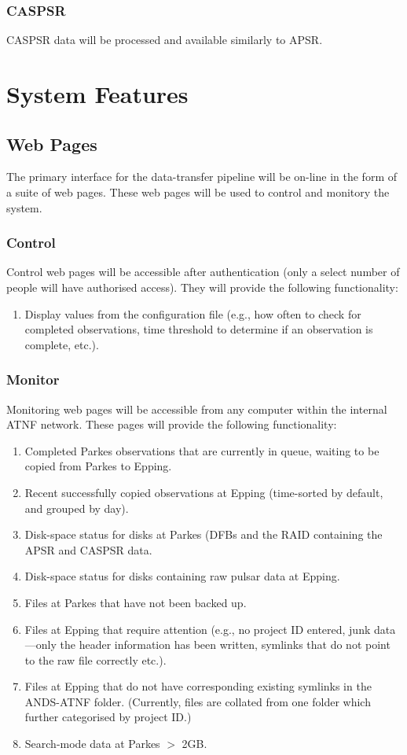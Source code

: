 \documentclass[a4paper,11pt]{article}
\begin{document}
\subsubsection{CASPSR}
CASPSR data will be processed and available similarly to APSR.
\section{System Features}

\subsection{Web Pages}
The primary interface for the data-transfer pipeline will be on-line in the form of a suite of web pages. These web pages will be used to control and monitory the system.

\subsubsection{Control}
Control web pages will be accessible after authentication (only a select number of people will have authorised access). They will provide the following functionality:

\begin{enumerate}
\item Display values from the configuration file (e.g., how often to check for completed observations, time threshold to determine if an observation is complete, etc.).
\end{enumerate}

\subsubsection{Monitor}
Monitoring web pages will be accessible from any computer within the internal ATNF network. These pages will provide the following functionality:

\begin{enumerate}
\item Completed Parkes observations that are currently in queue, waiting to be copied from Parkes to Epping.
\item Recent successfully copied observations at Epping (time-sorted by default, and grouped by day).
\item Disk-space status for disks at Parkes (DFBs and the RAID containing the APSR and CASPSR data.
\item Disk-space status for disks containing raw pulsar data at Epping.
\item Files at Parkes that have not been backed up.
\item Files at Epping that require attention (e.g., no project ID entered, junk data---only the header information has been written, symlinks that do not point to the raw file correctly etc.).
\item Files at Epping that do not have corresponding existing symlinks in the ANDS-ATNF folder. (Currently, files are collated from one folder which further categorised by project ID.)
\item Search-mode data at Parkes $>$ 2GB.
\end{enumerate}
\end{document}
